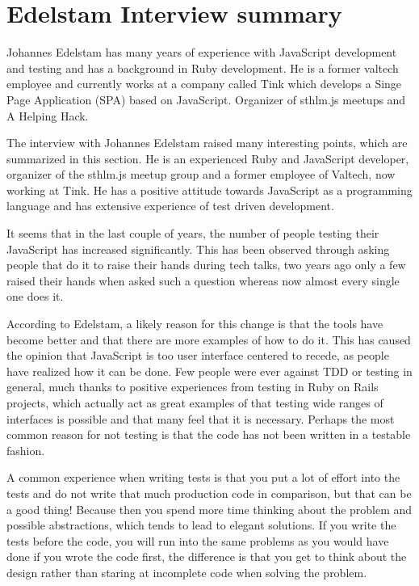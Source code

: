 \documentclass[11pt]{article}
\begin{document}
\section{Edelstam Interview summary}

Johannes Edelstam has many years of experience with JavaScript development and testing and has a background in Ruby development. He is a former valtech employee and currently works at a company called Tink which develops a Singe Page Application (SPA) based on JavaScript. Organizer of sthlm.js meetups and A Helping Hack.

The interview with Johannes Edelstam raised many interesting points, which are summarized in this section. He is an experienced Ruby and JavaScript developer, organizer of the sthlm.js meetup group and a former employee of Valtech, now working at Tink. He has a positive attitude towards JavaScript as a programming language and has extensive experience of test driven development.

It seems that in the last couple of years, the number of people testing their JavaScript has increased significantly\cite[question~1]{Edelstam}. This has been observed through asking people that do it to raise their hands during tech talks, two years ago only a few raised their hands when asked such a question whereas now almost every single one does it.

According to Edelstam, a likely reason for this change is that the tools have become better and that there are more examples of how to do it. This has caused the opinion that JavaScript is too user interface centered to recede, as people have realized how it can be done. Few people were ever against TDD or testing in general, much thanks to positive experiences from testing in Ruby on Rails projects, which actually act as great examples of that testing wide ranges of interfaces is possible and that many feel that it is necessary. Perhaps the most common reason for not testing is that the code has not been written in a testable fashion. \cite[questions~2-3]{Edelstam}

A common experience when writing tests is that you put a lot of effort into the tests and do not write that much production code in comparison, but that can be a good thing! Because then you spend more time thinking about the problem and possible abstractions, which tends to lead to elegant solutions. If you write the tests before the code, you will run into the same problems as you would have done if you wrote the code first, the difference is that you get to think about the design rather than staring at incomplete code when solving the problem. \cite[question~8]{Edelstam}
\end{document}
